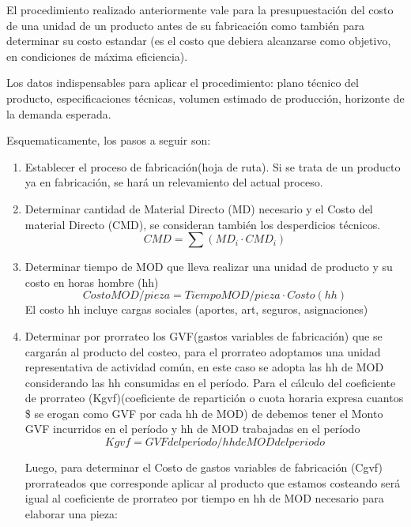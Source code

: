 \documentclass[a4paper,oneside,11pt]{article}
\begin{document}
El procedimiento realizado anteriormente vale para la presupuestación del costo de una unidad de un producto antes de su fabricación como también para determinar su costo estandar (es el costo que debiera alcanzarse como objetivo, en condiciones de máxima eficiencia).

Los datos indispensables para aplicar el procedimiento: plano técnico del producto, especificaciones técnicas, volumen estimado de producción, horizonte de la demanda esperada.

Esquematicamente, los pasos a seguir son:

\begin{enumerate}
    \item Establecer el proceso de fabricación(hoja de ruta). Si se trata  de un producto ya en fabricación, se hará un relevamiento del actual proceso.
    \item Determinar cantidad de Material Directo (MD) necesario y  el Costo del material Directo (CMD), se consideran también los desperdicios técnicos.
    \begin{equation}
        CMD = \sum (MD_{i} \cdot CMD_{i})
    \end{equation}
    \item Determinar tiempo de MOD que lleva realizar una unidad de producto y su costo en horas hombre (hh)
    \begin{equation}
        Costo MOD/pieza = Tiempo MOD/pieza \cdot Costo(hh)
    \end{equation}
    El costo hh incluye cargas sociales (aportes, art, seguros, asignaciones)

    \item Determinar por prorrateo los GVF(gastos variables de fabricación) que se cargarán al producto del costeo, para el prorrateo adoptamos una unidad representativa de actividad común, en este caso se adopta las hh de MOD considerando las hh consumidas en el período. Para el cálculo  del coeficiente  de prorrateo (Kgvf)(coeficiente de repartición o cuota horaria expresa cuantos \$ se erogan como GVF por cada hh de MOD) de debemos tener el Monto GVF incurridos en el período y hh de MOD trabajadas en el período
    \begin{equation}
        Kgvf= GVFdel período / hh de MOD del periodo 
    \end{equation}

    Luego, para determinar el Costo de gastos variables de fabricación (Cgvf) prorrateados que corresponde aplicar al producto que estamos costeando será igual al coeficiente de prorrateo por tiempo en hh de MOD necesario para elaborar una pieza:


\end{enumerate}
\end{document}
